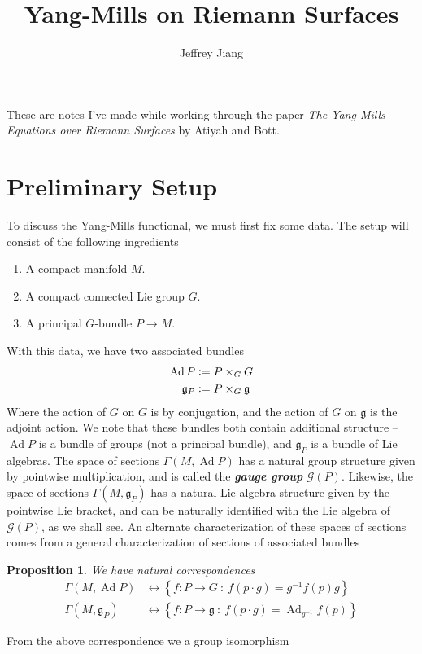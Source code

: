 \documentclass[psamsfonts, 12pt]{amsart}
\newtheorem{prop}[thm]{Proposition}
\theoremstyle{definition}
\theoremstyle{remark}
\newcommand{\ib}[1]{\textbf{\textit{#1}}}
\newcommand{\g}{\mathfrak{g}}
\newcommand{\inv}{^{-1}}
\newcommand{\set}[1]{\left\lbrace #1 \right\rbrace}
\newcommand{\defeq}{\vcentcolon=}
\DeclareMathOperator{\Ad}{Ad}
\begin{document}
%
\author{Jeffrey Jiang}
%
\title{Yang-Mills on Riemann Surfaces}
%
\maketitle
%
These are notes I've made while working through the paper \emph{The Yang-Mills
Equations over Riemann Surfaces} \cite{10.2307/37156} by Atiyah and Bott.
%
\tableofcontents
%
\section{Preliminary Setup}
%
To discuss the Yang-Mills functional, we must first fix some data. The setup will
consist of the following ingredients
\begin{enumerate}
  \item A compact manifold $M$.
  \item A compact connected Lie group $G$.
  \item A principal $G$-bundle $P \to M$.
\end{enumerate}
%
With this data, we have two associated bundles
\begin{align*}
\Ad P &\defeq P \times_G G \\
\g_P &\defeq P \times_G \g
\end{align*}
%
Where the action of $G$ on $G$ is by conjugation, and the action of $G$ on $\g$
is the adjoint action. We note that these bundles both contain additional structure --
$\Ad P$ is a bundle of groups (not a principal bundle), and $\g_P$ is a bundle of Lie
algebras. The space of sections $\Gamma(M, \Ad P)$ has
a natural group structure given by pointwise multiplication, and is called the
\ib{gauge group} $\mathscr{G}(P)$. Likewise, the space of sections
$\Gamma(M, \g_P)$ has a natural Lie algebra structure given by the pointwise Lie
bracket, and can be naturally identified with the Lie algebra of $\mathscr{G}(P)$,
as we shall see. An alternate characterization of these spaces of sections comes from
a general characterization of sections of associated bundles
%
\begin{prop}
We have natural correspondences
\begin{align*}
\Gamma(M, \Ad P) &\longleftrightarrow \set{f : P \to G ~:~ f(p\cdot g) = g\inv f(p)g} \\
\Gamma(M, \g_P) &\longleftrightarrow \set{f : P \to \g ~:~ f(p\cdot g) = \Ad_{g\inv}f(p)}
\end{align*}
\end{prop}
%
From the above correspondence we a group isomorphism
\end{document}
